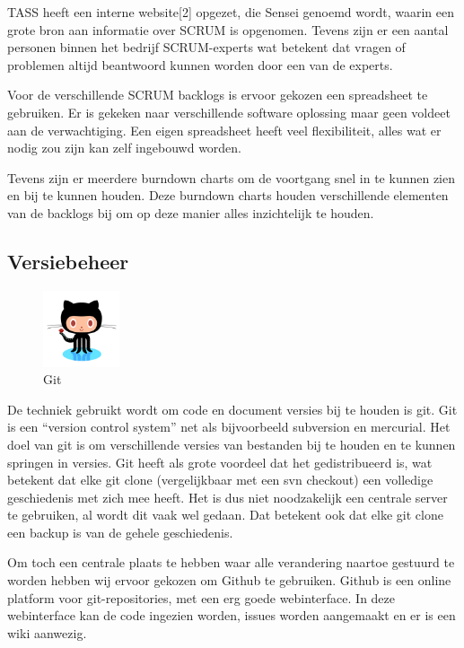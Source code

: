 \documentclass[]{article}
\begin{document}
TASS heeft een interne website[2] opgezet, die Sensei genoemd wordt, waarin
een grote bron aan informatie over SCRUM is opgenomen. Tevens zijn er een
aantal personen binnen het bedrijf SCRUM-experts wat betekent dat vragen of
problemen altijd beantwoord kunnen worden door een van de experts.

Voor de verschillende SCRUM backlogs is ervoor gekozen een spreadsheet te
gebruiken. Er is gekeken naar verschillende software oplossing maar geen
voldeet aan de verwachtiging. Een eigen spreadsheet heeft veel
flexibiliteit, alles wat er nodig zou zijn kan zelf ingebouwd worden.

Tevens zijn er meerdere burndown charts om de voortgang snel in te kunnen
zien en bij te kunnen houden. Deze burndown charts houden verschillende
elementen van de backlogs bij om op deze manier alles inzichtelijk te
houden.

\newpage
\subsection{Versiebeheer}

\begin{figure}
  \begin{center}
    \includegraphics[width=0.20\textwidth]{git.pdf}
  \end{center}
  \caption{Git}
\end{figure}
De techniek gebruikt wordt om code en document versies bij te houden is
git. Git is een “version control system” net als bijvoorbeeld subversion en
mercurial. Het doel van git is om verschillende versies van bestanden bij
te houden en te kunnen springen in versies. Git heeft als grote voordeel
dat het gedistribueerd is, wat betekent dat elke git clone (vergelijkbaar
met een svn checkout) een volledige geschiedenis met zich mee heeft. Het is
dus niet noodzakelijk een centrale server te gebruiken, al wordt dit vaak
wel gedaan. Dat betekent ook dat elke git clone een backup is van de gehele
geschiedenis.

Om toch een centrale plaats te hebben waar alle verandering naartoe
gestuurd te worden hebben wij ervoor gekozen om Github te gebruiken. Github
is een online platform voor git-repositories, met een erg goede
webinterface. In deze webinterface kan de code ingezien worden, issues
worden aangemaakt en er is een wiki aanwezig.
\end{document}
